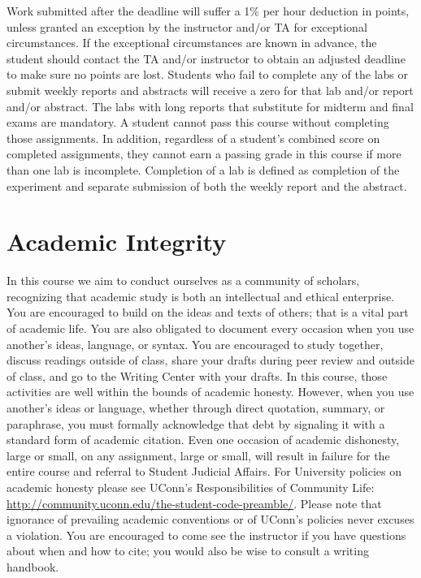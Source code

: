 \documentclass{revtex4}
\begin{document}
Work submitted after the deadline will suffer a 1\% per hour deduction in
points, unless granted an exception by the instructor and/or TA for 
exceptional circumstances. If the exceptional circumstances are known in
advance, the student should contact the TA and/or instructor to obtain an
adjusted deadline to make sure no points are lost. Students who fail to
complete any of the labs or submit weekly reports and abstracts will 
receive a zero for that lab and/or report and/or abstract. The labs with
long reports that substitute for midterm and final exams are mandatory.
A student cannot pass this course without completing those assignments.
In addition, regardless of a student's combined score on completed 
assignments, they cannot earn a passing grade in this course if more than
one lab is incomplete. Completion of a lab is defined as completion of the
experiment and separate submission of both the weekly report and the abstract.

\section{Academic Integrity}
In this course we aim to conduct ourselves as a community of scholars,
recognizing that academic study is both an intellectual and ethical enterprise.
You are encouraged to build on the ideas and texts of others; that is a vital
part of academic life. You are also obligated to document every occasion when
you use another's ideas, language, or syntax. You are encouraged to study
together, discuss readings outside of class, share your drafts during peer
review and outside of class, and go to the Writing Center with your drafts.
In this course, those activities are well within the bounds of academic honesty.
However, when you use another's ideas or language, whether through direct
quotation, summary, or paraphrase, you must formally acknowledge that debt by
signaling it with a standard form of academic citation. Even one occasion of
academic dishonesty, large or small, on any assignment, large or small, will
result in failure for the entire course and referral to Student Judicial
Affairs. For University policies on academic honesty please see UConn's
Responsibilities of Community Life: 
\url{http://community.uconn.edu/the-student-code-preamble/}.
Please note that ignorance of prevailing academic conventions or of
UConn's policies never excuses a violation. You are encouraged to come see
the instructor if you have questions about when and how to cite; you would
also be wise to consult a writing handbook.
\end{document}
